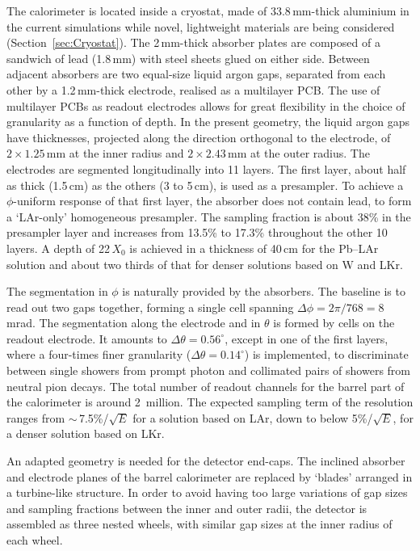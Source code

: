 The calorimeter is located inside a cryostat, 
made of 33.8\,mm-thick aluminium in the current simulations 
while novel, lightweight materials are being considered (Section~\ref{sec:Cryostat}).
The 2\,mm-thick absorber plates are composed of a sandwich of lead (1.8\,mm) with steel sheets glued on either side.
Between adjacent absorbers are two equal-size liquid argon gaps, 
separated from each other by a 1.2\,mm-thick electrode, realised as a multilayer PCB.
The use of multilayer PCBs as readout electrodes allows for great flexibility in the choice of granularity as a function of depth.
In the present geometry, the liquid argon gaps have thicknesses, 
projected along the direction orthogonal to the electrode,
of $2 \times 1.25$\,mm at the inner radius and $2 \times 2.43$\,mm at the outer radius.
The electrodes are segmented longitudinally into 11 layers.
The first layer, about half as thick (1.5\,cm) as the others (3 to 5\,cm), is used as a presampler. 
To achieve a $\phi$-uniform response of that first layer, 
the absorber does not contain lead, to form a `LAr-only' homogeneous presampler.
The sampling fraction is about 38\% in the presampler layer 
and increases from 13.5\% to 17.3\% throughout the other 10 layers.
A depth of 22\,$X_0$ is achieved in a thickness of 40\,cm for the Pb--LAr solution 
and about two thirds of that for denser solutions based on W and LKr.


The segmentation in $\phi$ is naturally provided by the absorbers.
The baseline is to read out two gaps together, forming a single cell spanning $\Delta\phi = 2\pi/768 = 8$\,mrad. 
The segmentation along the electrode and in $\theta$ is formed by cells on the readout electrode.  
It amounts to $\Delta\theta = 0.56^\circ$, except in one of the first layers, 
where a four-times finer granularity ($\Delta\theta = 0.14^\circ$) is implemented, 
to discriminate between single showers from prompt photon and collimated pairs of showers from neutral pion decays. 
The total number of readout channels for the barrel part of the calorimeter is around 2~million.
The expected sampling term of the resolution ranges from $\sim$\,7.5\%/$\sqrt{E}$ for a solution based on LAr, 
down to below 5\%/$\sqrt{E}$, for a denser solution based on LKr.

An adapted geometry is needed for the detector end-caps. 
The inclined absorber and electrode planes of the barrel calorimeter are replaced by `blades' arranged in a turbine-like structure. 
In order to avoid having too large variations of gap sizes and sampling fractions between the inner and outer radii, 
the detector is assembled as three nested wheels, with similar gap sizes at the inner radius of each wheel.

